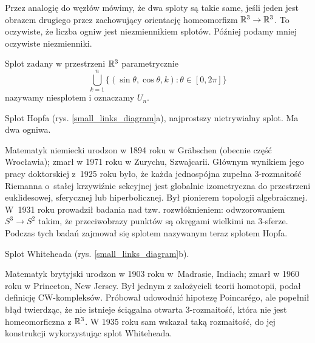 Przez analogię do węzłów mówimy, że dwa sploty są takie same, jeśli jeden jest obrazem drugiego przez zachowujący orientację homeomorfizm $\mathbb R^3 \to \mathbb R^3$.
To oczywiste, że liczba ogniw jest niezmiennikiem splotów.
Później podamy mniej oczywiste niezmienniki.

\begin{example}[niesplot]
%
    Splot zadany w przestrzeni $\mathbb R^3$ parametrycznie
    \begin{equation}
        \bigcup_{k=1}^n \{(\sin \theta, \cos \theta, k) : \theta \in [0, 2\pi]\}
    \end{equation}
    nazywamy niesplotem i oznaczamy $U_n$.
\end{example}
    
\begin{example}
%
%
    Splot Hopfa (rys. \ref{small_links_diagram}a), najprostszy nietrywialny splot. Ma dwa ogniwa.
\end{example}

\begin{remark}
    Matematyk niemiecki urodzon w 1894 roku w Gräbschen (obecnie część Wrocławia); zmarł w 1971 roku w Zurychu, Szwajcarii.
    Głównym wynikiem jego pracy doktorskiej z~1925 roku było, że każda jednospójna zupełna 3-rozmaitość Riemanna o~stałej krzywiźnie sekcyjnej jest globalnie izometryczna do przestrzeni euklidesowej, sferycznej lub hiperbolicznej.
    Był pionierem topologii algebraicznej.
    W~1931 roku prowadził badania nad tzw. rozwłóknieniem: odwzorowaniem $S^3 \to S^2$ takim, że przeciwobrazy punktów są okręgami wielkimi na 3-sferze.
    Podczas tych badań zajmował się splotem nazywanym teraz splotem Hopfa.
\end{remark}

\begin{example}
%
%
    Splot Whiteheada (rys. \ref{small_links_diagram}b).
\end{example}

\begin{remark}
    Matematyk brytyjski urodzon w 1903 roku w~Madrasie, Indiach; zmarł w 1960 roku w Princeton, New Jersey.
    Był jednym z założycieli teorii homotopii, podał definicję CW-kompleksów.
    Próbował udowodnić hipotezę Poincarégo, ale popełnił błąd twierdząc, że nie istnieje ściągalna otwarta 3-rozmaitość, która nie jest homeomorficzna z $\mathbb R^3$.
    W 1935 roku sam wskazał taką rozmaitość, do jej konstrukcji wykorzystując splot Whiteheada.
\end{remark}

